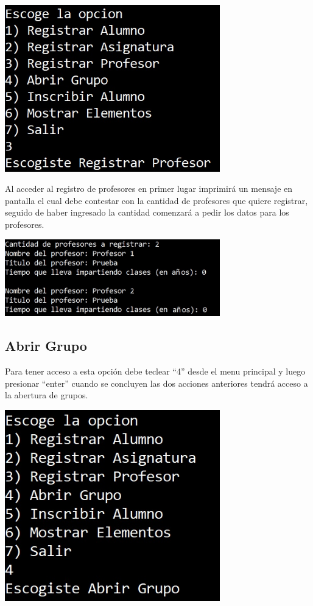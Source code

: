 \documentclass[12pt]{report}
\begin{document}
\begin{center}
    \includegraphics[width=0.7\textwidth]{img/Opcion 3 P1.jpg}
\end{center}

\newpage
Al acceder al registro de profesores en primer lugar imprimirá un mensaje en pantalla el cual debe contestar con la cantidad de profesores que quiere registrar, seguido de haber ingresado la cantidad comenzará a pedir los datos para los profesores.

\begin{center}
    \includegraphics[width=0.7\textwidth]{img/Opcion 3 P2.jpg}
\end{center}

\subsection*{Abrir Grupo}
Para tener acceso a esta opción debe teclear ``4'' desde el menu principal y luego presionar ``enter'' cuando se concluyen las dos acciones anteriores tendrá acceso a la abertura de grupos.

\begin{center}
    \includegraphics[width=0.7\textwidth]{img/Opcion 4 P1.jpg}
\end{center}
\end{document}
